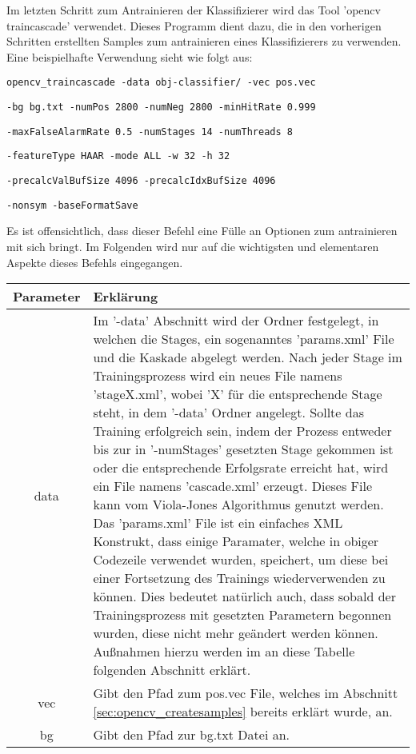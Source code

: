 Im letzten Schritt zum Antrainieren der Klassifizierer wird das Tool 'opencv traincascade' verwendet. Dieses Programm dient dazu, die in den vorherigen Schritten erstellten Samples zum antrainieren eines Klassifizierers zu verwenden. Eine beispielhafte Verwendung sieht wie folgt aus:
\begin{lstlisting}
opencv_traincascade -data obj-classifier/ -vec pos.vec 
\end{lstlisting}
\begin{lstlisting}
-bg bg.txt -numPos 2800 -numNeg 2800 -minHitRate 0.999 
\end{lstlisting}
\begin{lstlisting}
-maxFalseAlarmRate 0.5 -numStages 14 -numThreads 8 
\end{lstlisting}
\begin{lstlisting}
-featureType HAAR -mode ALL -w 32 -h 32 
\end{lstlisting}
\begin{lstlisting}
-precalcValBufSize 4096 -precalcIdxBufSize 4096 
\end{lstlisting}
\begin{lstlisting}
-nonsym -baseFormatSave
\end{lstlisting}
Es ist offensichtlich, dass dieser Befehl eine Fülle an Optionen zum antrainieren mit sich bringt. Im Folgenden wird nur auf die wichtigsten und elementaren Aspekte dieses Befehls eingegangen.
\begin{table}[H]
\begin{tabularx}{\textwidth}{|c|X|}
\hline
Parameter & Erklärung \\ 
\hline
data & Im '-data' Abschnitt wird der Ordner festgelegt, in welchen die Stages, ein sogenanntes 'params.xml' File und die Kaskade abgelegt werden. Nach jeder Stage im Trainingsprozess wird ein neues File namens 'stageX.xml', wobei 'X' für die entsprechende Stage steht, in dem '-data' Ordner angelegt. Sollte das Training erfolgreich sein, indem der Prozess entweder bis zur in '-numStages' gesetzten Stage gekommen ist oder die entsprechende Erfolgsrate erreicht hat, wird ein File namens 'cascade.xml' erzeugt. Dieses File kann vom Viola-Jones Algorithmus genutzt werden. Das 'params.xml' File ist ein einfaches XML Konstrukt, dass einige Paramater, welche in obiger Codezeile verwendet wurden, speichert, um diese bei einer Fortsetzung des Trainings wiederverwenden zu können. Dies bedeutet natürlich auch, dass sobald der Trainingsprozess mit gesetzten Parametern begonnen wurden, diese nicht mehr geändert werden können. Außnahmen hierzu werden im an diese Tabelle folgenden Abschnitt erklärt. \\ 
\hline
vec & Gibt den Pfad zum pos.vec File, welches im Abschnitt  \ref{sec:opencv_createsamples} bereits erklärt wurde, an.\\ 
\hline
bg & Gibt den Pfad zur bg.txt Datei an.\\ \hline
\end{tabularx}
\end{table}


